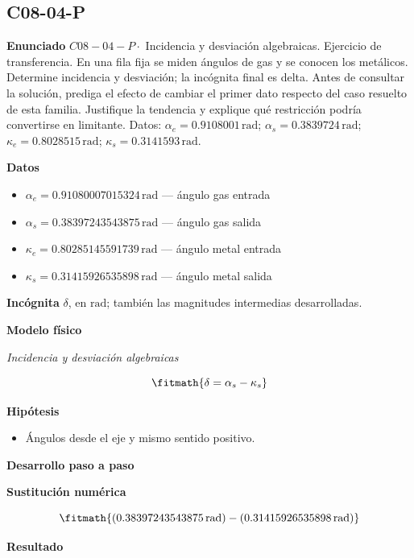 \documentclass[10pt,openany]{book}
\begin{document}
\subsection*{C08-04-P}

\noindent\textbf{Enunciado}
\(C08-04-P \cdot\) Incidencia y desviación algebraicas. Ejercicio de transferencia. En una fila fija se miden ángulos de gas y se conocen los metálicos. Determine incidencia y desviación; la incógnita final es delta. Antes de consultar la solución, prediga el efecto de cambiar el primer dato respecto del caso resuelto de esta familia. Justifique la tendencia y explique qué restricción podría convertirse en limitante. Datos: \(\alpha_e=0.9108001\, \mathrm{rad}\); \(\alpha_s=0.3839724\, \mathrm{rad}\); \(\kappa_e=0.8028515\, \mathrm{rad}\); \(\kappa_s=0.3141593\, \mathrm{rad}\).

\noindent\textbf{Datos}
\begin{itemize}
\item $\alpha_e = 0.91080007015324\,\mathrm{rad}$ — ángulo gas entrada
\item $\alpha_s = 0.38397243543875\,\mathrm{rad}$ — ángulo gas salida
\item $\kappa_e = 0.80285145591739\,\mathrm{rad}$ — ángulo metal entrada
\item $\kappa_s = 0.31415926535898\,\mathrm{rad}$ — ángulo metal salida
\end{itemize}

\noindent\textbf{Incógnita}
$\delta$, en $\mathrm{rad}$; también las magnitudes intermedias desarrolladas.

\noindent\textbf{Modelo físico}

\noindent\textit{Incidencia y desviación algebraicas}

\[
\fitmath{\delta=\alpha_s - \kappa_s}
\]

\noindent\textbf{Hipótesis}
\begin{itemize}
\item Ángulos desde el eje y mismo sentido positivo.
\end{itemize}

\noindent\textbf{Desarrollo paso a paso}



\noindent\textbf{Sustitución numérica}

\[
\fitmath{\left(0.38397243543875\,\mathrm{rad}\right) - \left(0.31415926535898\,\mathrm{rad}\right)}
\]

\noindent\textbf{Resultado}
\end{document}
